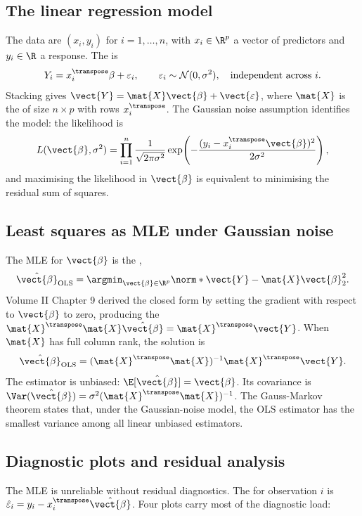 \subsection{The linear regression model}

The data are $(x_{i}, y_{i})$ for $i = 1, \ldots, n$, with $x_{i}
\in \R^{p}$ a vector of predictors and $y_{i} \in \R$ a response.
The  is
\[
Y_{i} = x_{i}^{\transpose}\beta + \varepsilon_{i},
\qquad \varepsilon_{i} \sim \mathcal{N}(0, \sigma^{2}),
\quad \text{independent across } i.
\]
Stacking gives $\vect{Y} = \mat{X}\vect{\beta} + \vect{\varepsilon}$,
where $\mat{X}$ is the  of size $n \times p$
with rows $x_{i}^{\transpose}$. The Gaussian noise assumption
identifies the model: the likelihood is
\[
L(\vect{\beta}, \sigma^{2})
= \prod_{i=1}^{n}\frac{1}{\sqrt{2\pi\sigma^{2}}}
  \exp\!\left(-\frac{(y_{i} - x_{i}^{\transpose}\vect{\beta})^{2}}{2\sigma^{2}}\right),
\]
and maximising the likelihood in $\vect{\beta}$ is equivalent to
minimising the residual sum of squares.

\subsection{Least squares as MLE under Gaussian noise}

The MLE for $\vect{\beta}$ is the ,
\[
\hat{\vect{\beta}}_{\mathrm{OLS}}
  = \argmin_{\vect{\beta} \in \R^{p}}
    \norm*{\vect{Y} - \mat{X}\vect{\beta}}_{2}^{2}.
\]
Volume II Chapter 9 derived the closed form by setting the
gradient with respect to $\vect{\beta}$ to zero, producing the
 $\mat{X}^{\transpose}\mat{X}
\hat{\vect{\beta}} = \mat{X}^{\transpose}\vect{Y}$. When $\mat{X}$
has full column rank, the solution is
\[
\hat{\vect{\beta}}_{\mathrm{OLS}}
  = (\mat{X}^{\transpose}\mat{X})^{-1}\mat{X}^{\transpose}\vect{Y}.
\]
The estimator is unbiased: $\E[\hat{\vect{\beta}}] = \vect{\beta}$.
Its covariance is $\Var(\hat{\vect{\beta}}) = \sigma^{2}
(\mat{X}^{\transpose}\mat{X})^{-1}$. The Gauss-Markov theorem
states that, under the Gaussian-noise model, the OLS estimator has
the smallest variance among all linear unbiased estimators.

\subsection{Diagnostic plots and residual analysis}

The MLE is unreliable without residual diagnostics. The
 for observation $i$ is $\hat{\varepsilon}_{i} =
y_{i} - x_{i}^{\transpose}\hat{\vect{\beta}}$. Four plots carry
most of the diagnostic load:


